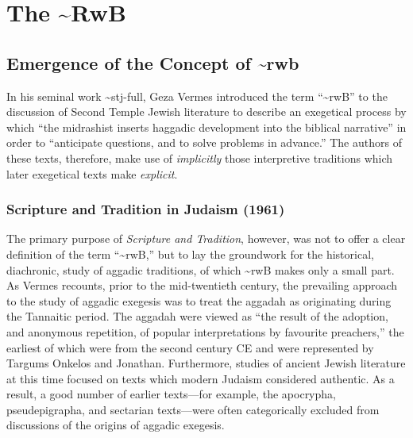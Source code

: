 \chapter{The \textasciitilde{}RwB}\label{the-rwb}

\section{Emergence of the Concept of
\textasciitilde{}rwb}\label{emergence-of-the-concept-of-rwb}

In his seminal work \textasciitilde{}stj-full, Geza Vermes introduced
the term ``\textasciitilde{}rwB'' to the discussion of Second Temple
Jewish literature to describe an exegetical process by which ``the
midrashist inserts haggadic development into the biblical narrative'' in
order to ``anticipate questions, and to solve problems in
advance.''\autocites[95]{vermes1961}[see also][]{vermes_zsengeller2014}
The authors of these texts, therefore, make use of \emph{implicitly}
those interpretive traditions which later exegetical texts make
\emph{explicit}.

\subsection{Scripture and Tradition in Judaism
(1961)}\label{scripture-and-tradition-in-judaism-1961}

The primary purpose of \emph{Scripture and Tradition}, however, was not
to offer a clear definition of the term ``\textasciitilde{}rwB,'' but to
lay the groundwork for the historical, diachronic, study of aggadic
traditions, of which \textasciitilde{}rwB makes only a small
part.\autocite[3]{vermes_zsengeller2014} As Vermes recounts, prior to
the mid-twentieth century, the prevailing approach to the study of
aggadic exegesis was to treat the aggadah as originating during the
Tannaitic period. The aggadah were viewed as ``the result of the
adoption, and anonymous repetition, of popular interpretations by
favourite preachers,'' \autocite[3]{vermes1961} the earliest of which
were from the second century CE and were represented by Targums Onkelos
and Jonathan. Furthermore, studies of ancient Jewish literature at this
time focused on texts which modern Judaism considered authentic. As a
result, a good number of earlier texts---for example, the apocrypha,
pseudepigrapha, and sectarian texts---were often categorically excluded
from discussions of the origins of aggadic
exegesis.\autocite[2]{vermes1961}

